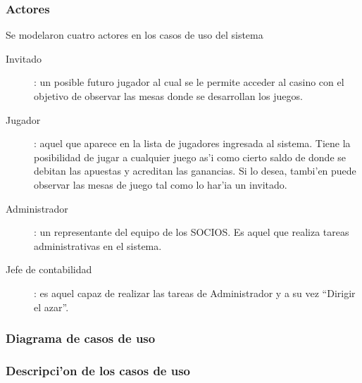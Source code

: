 \subsubsection{Actores}
Se modelaron cuatro actores en los casos de uso del sistema

\begin{description}
\item[Invitado]: un posible futuro jugador al cual se le permite acceder al casino con el objetivo de observar las mesas donde se desarrollan los juegos.
\item[Jugador]: aquel que aparece en la lista de jugadores ingresada al sistema. Tiene la posibilidad de jugar a cualquier juego as'i como cierto saldo de donde se debitan las apuestas y acreditan las ganancias. Si lo desea, tambi'en puede observar las mesas de juego tal como lo har'ia un invitado.
\item[Administrador]: un representante del equipo de los SOCIOS. Es aquel que realiza tareas administrativas en el sistema.
\item[Jefe de contabilidad]: es aquel capaz de realizar las tareas de Administrador y a su vez ``Dirigir el azar''.
\end{description}


\clearpage
\subsubsection{Diagrama de casos de uso}




\subsubsection{Descripci'on de los casos de uso}





